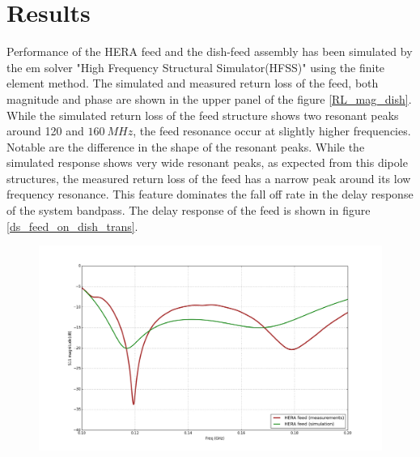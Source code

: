 \documentclass[twocolumn]{emulateapj}
\newcommand{\vis}{{V}}
\begin{document}
\section{\textbf{Results}}
Performance of the HERA feed and the dish-feed assembly has been simulated by the em solver "High Frequency Structural Simulator(HFSS)" using the finite element method. 
The simulated and measured return loss of the feed, both magnitude and phase are shown in the upper panel of the figure \ref{RL_mag_dish}. While the simulated return loss of the feed structure shows two resonant peaks around 120 and $160~MHz$, the feed resonance occur at slightly higher frequencies. Notable are the difference in the shape of the resonant peaks. While the simulated response shows very wide resonant peaks, as expected from this dipole structures, the measured return loss of the feed has a narrow peak around its low frequency resonance. This feature dominates the fall off rate in the delay response of the system bandpass. The delay response of the feed is shown in figure \ref{ds_feed_on_dish_trans}. \begin{figure}[ht]
\begin{minipage}[b]{0.5\linewidth}
\centering
\includegraphics[angle=0, width=\linewidth]{GB_reflectometry_part3/plot/RL_mag_feed.png}
\end{minipage}
\hspace{0.1cm}
\begin{minipage}[b]{0.5\linewidth}

\end{minipage}
\end{figure}
\end{document}

